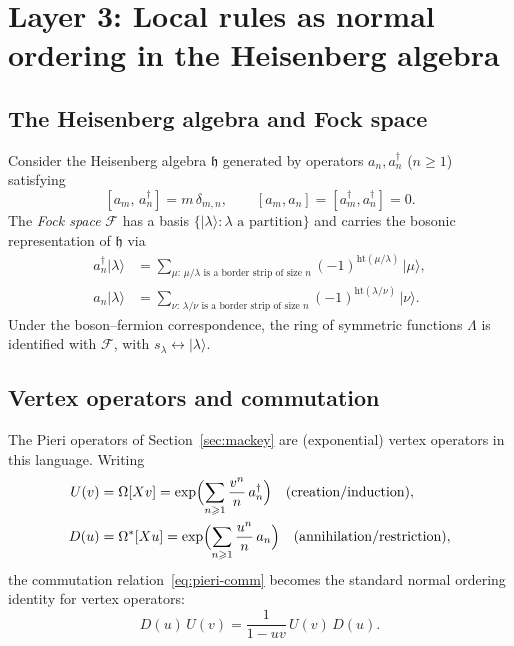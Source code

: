 \documentclass[12pt,a4paper]{article}
\theoremstyle{definition}
\theoremstyle{remark}
\begin{document}
\section{Layer 3: Local rules as normal ordering in the Heisenberg algebra}
\label{sec:heisenberg}

\subsection{The Heisenberg algebra and Fock space}

Consider the Heisenberg algebra $\mathfrak{h}$ generated by operators
$a_n, a_n^\dagger$ ($n \geqslant 1$) satisfying
\[
  [a_m,\, a_n^\dagger] = m\,\delta_{m,n}, \qquad
  [a_m, a_n] = [a_m^\dagger, a_n^\dagger] = 0.
\]
The \emph{Fock space} $\mathcal{F}$ has a basis
$\{|\lambda\rangle : \lambda \text{ a partition}\}$ and carries the
bosonic representation of $\mathfrak{h}$ via
\begin{align*}
  a_n^\dagger |\lambda\rangle
  &= \sum_{\mu:\, \mu/\lambda \text{ is a border strip of size } n}
     (-1)^{\mathrm{ht}(\mu/\lambda)}\, |\mu\rangle, \\
  a_n |\lambda\rangle
  &= \sum_{\nu:\, \lambda/\nu \text{ is a border strip of size } n}
     (-1)^{\mathrm{ht}(\lambda/\nu)}\, |\nu\rangle.
\end{align*}
Under the boson--fermion correspondence, the ring of symmetric
functions $\Lambda$ is identified with $\mathcal{F}$, with
$s_\lambda \leftrightarrow |\lambda\rangle$.

\subsection{Vertex operators and commutation}

The Pieri operators of Section~\ref{sec:mackey} are (exponential)
vertex operators in this language. Writing
\begin{align*}
  U(v) &= \Omega[Xv] = \exp\Bigl(\sum_{n \geqslant 1}
    \frac{v^n}{n}\, a_n^\dagger\Bigr)
    \quad \text{(creation/induction)}, \\
  D(u) &= \Omega^*[Xu] = \exp\Bigl(\sum_{n \geqslant 1}
    \frac{u^n}{n}\, a_n\Bigr)
    \quad \text{(annihilation/restriction)},
\end{align*}
the commutation relation~\eqref{eq:pieri-comm} becomes the standard
normal ordering identity for vertex operators:
\begin{equation}\label{eq:normal-ordering}
  D(u)\, U(v) = \frac{1}{1-uv}\, U(v)\, D(u).
\end{equation}
\end{document}
